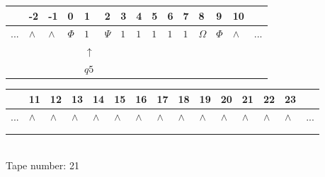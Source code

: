 \documentclass[11pt]{article}
\begin{document}
\begin{table}[H]
\centering
\begin{tabular}{lllllllllllllll}
 & -2 & -1 & 0 & 1 & 2 & 3 & 4 & 5 & 6 & 7 & 8 & 9 & 10 & \\
\hline
$...$ & \multicolumn{1}{|l|}{$\wedge$} & \multicolumn{1}{|l|}{$\wedge$} & \multicolumn{1}{|l|}{$\Phi$} & \multicolumn{1}{|l|}{$1$} & \multicolumn{1}{|l|}{$\Psi$} & \multicolumn{1}{|l|}{$1$} & \multicolumn{1}{|l|}{$1$} & \multicolumn{1}{|l|}{$1$} & \multicolumn{1}{|l|}{$1$} & \multicolumn{1}{|l|}{$1$} & \multicolumn{1}{|l|}{$\Omega$} & \multicolumn{1}{|l|}{$\Phi$} & \multicolumn{1}{|l|}{$\wedge$} & $...$\\
\hline
&  &  &  & $\uparrow$ &  &  &  &  &  &  &  &  &  &  \\
&  &  &  & $ q5 $ &  &  &  &  &  &  &  &  &  &  \\
\end{tabular}
\begin{tabular}{lllllllllllllll}
 & 11 & 12 & 13 & 14 & 15 & 16 & 17 & 18 & 19 & 20 & 21 & 22 & 23 & \\
\hline
$...$ & \multicolumn{1}{|l|}{$\wedge$} & \multicolumn{1}{|l|}{$\wedge$} & \multicolumn{1}{|l|}{$\wedge$} & \multicolumn{1}{|l|}{$\wedge$} & \multicolumn{1}{|l|}{$\wedge$} & \multicolumn{1}{|l|}{$\wedge$} & \multicolumn{1}{|l|}{$\wedge$} & \multicolumn{1}{|l|}{$\wedge$} & \multicolumn{1}{|l|}{$\wedge$} & \multicolumn{1}{|l|}{$\wedge$} & \multicolumn{1}{|l|}{$\wedge$} & \multicolumn{1}{|l|}{$\wedge$} & \multicolumn{1}{|l|}{$\wedge$} & $...$\\
\hline
&  &  &  &  &  &  &  &  &  &  &  &  &  &  \\
&  &  &  &  &  &  &  &  &  &  &  &  &  &  \\
\end{tabular}
\\
Tape number: 21
\noindent\makebox[\linewidth]{\hdashrule{\textwidth}{1pt}{1pt}}\end{table}
\end{document}

